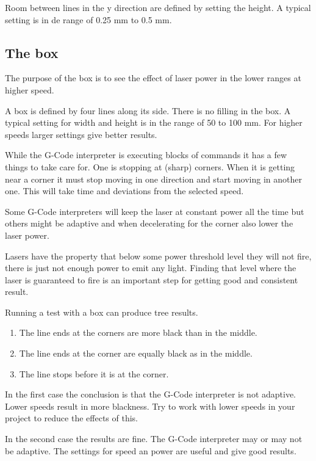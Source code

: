 Room between lines in the y direction are defined by setting the height. A typical setting is in de range of 0.25 mm to 0.5 mm.

\subsection{The box}
The purpose of the box is to see the effect of laser power in the lower ranges
at higher speed.

A box is defined by four lines along its side. There is no filling in the box. A typical setting for width and height
is in the range of 50 to 100 mm. For higher speeds larger settings give better results.

While the G-Code interpreter is executing blocks of commands it has a few things to take care for. One is stopping at
(sharp) corners. When it is getting near a corner it must stop moving in one direction and start moving in another one.
This will take time and deviations from the selected speed.

Some G-Code interpreters will keep the laser at constant power all the time but others might be adaptive and when
decelerating for the corner also lower the laser power.

Lasers have the property that below some power threshold level they will not fire,
there is just not enough power to emit any light. Finding that level where the laser is guaranteed to fire is an
important step for getting good and consistent result.

Running a test with a box can produce tree results.
\begin{enumerate}
    \item The line ends at the corners are more black than in the middle.
    \item The line ends at the corner are equally black as in the middle.
    \item The line stops before it is at the corner.
\end{enumerate}

In the first case the conclusion is that the G-Code interpreter is not adaptive. Lower speeds result in more blackness.
Try to work with lower speeds in your project to reduce the effects of this.

In the second case the results are fine. The G-Code interpreter may or may not be adaptive. The settings for speed an
power are useful and give good results.

